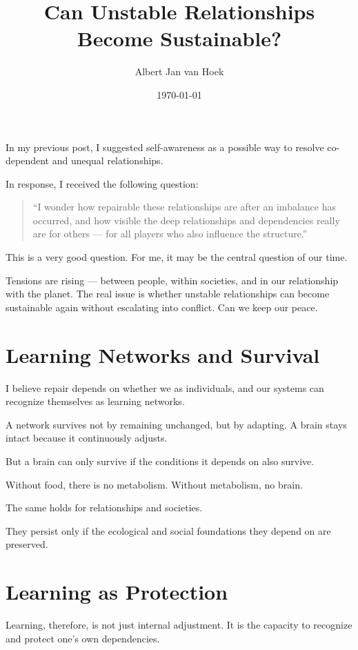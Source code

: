 \documentclass{article}
\title{Can Unstable Relationships Become Sustainable?}
\author{Albert Jan van Hoek}
\date{\today}
\begin{document}
\maketitle

In my previous post, I suggested self-awareness as a possible way to resolve co-dependent and unequal relationships.

In response, I received the following question:

\begin{quote}
``I wonder how repairable these relationships are after an imbalance has occurred, and how visible the deep relationships and dependencies really are for others — for all players who also influence the structure.''
\end{quote}

This is a very good question. For me, it may be the central question of our time.

Tensions are rising — between people, within societies, and in our relationship with the planet. The real issue is whether unstable relationships can become sustainable again without escalating into conflict. Can we keep our peace.

\section*{Learning Networks and Survival}

I believe repair depends on whether we as individuals, and our systems can recognize themselves as learning networks.

A network survives not by remaining unchanged, but by adapting.
A brain stays intact because it continuously adjusts.

But a brain can only survive if the conditions it depends on also survive.

Without food, there is no metabolism.
Without metabolism, no brain.

The same holds for relationships and societies.

They persist only if the ecological and social foundations they depend on are preserved.

\section*{Learning as Protection}

Learning, therefore, is not just internal adjustment.
It is the capacity to recognize and protect one’s own dependencies.
\end{document}
